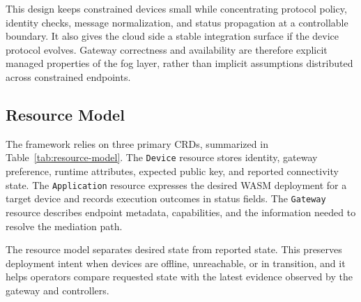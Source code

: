 This design keeps constrained devices small while concentrating protocol policy, identity checks, message normalization, and status propagation at a controllable boundary. It also gives the cloud side a stable integration surface if the device protocol evolves. Gateway correctness and availability are therefore explicit managed properties of the fog layer, rather than implicit assumptions distributed across constrained endpoints.

\subsection{Resource Model}
The framework relies on three primary CRDs, summarized in Table~\ref{tab:resource-model}. The \texttt{Device} resource stores identity, gateway preference, runtime attributes, expected public key, and reported connectivity state. The \texttt{Application} resource expresses the desired WASM deployment for a target device and records execution outcomes in status fields. The \texttt{Gateway} resource describes endpoint metadata, capabilities, and the information needed to resolve the mediation path.

\begin{table}
\centering
\caption{Primary CRDs and control/evidence ownership.}
\label{tab:resource-model}
\footnotesize
\setlength{\tabcolsep}{3pt}
\end{table}

The resource model separates desired state from reported state. This preserves deployment intent when devices are offline, unreachable, or in transition, and it helps operators compare requested state with the latest evidence observed by the gateway and controllers.


